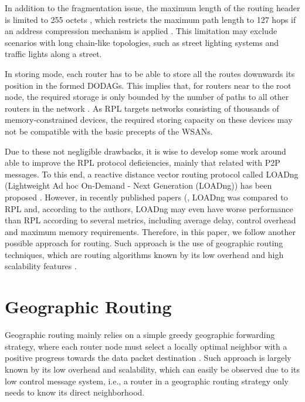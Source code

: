 \documentclass[final,authoryear,3p,twocolumn]{elsarticle}
\begin{document}
In addition to the fragmentation issue, the maximum length of the routing header is limited to 255 octets \citep{RFC4944}, which restricts the maximum path length to 127 hops if an address compression mechanism is applied \citep{herberg}. This limitation may exclude scenarios with long chain-like topologies, such as street lighting systems and traffic lights along a street.

In storing mode, each router has to be able to store all the routes downwards its position in the formed DODAGs. This implies that, for routers near to the root node, the required storage is only bounded by the number of paths to all other routers in the network \citep{RPL_observations}. As RPL targets networks consisting of thousands of memory-constrained devices, the required storing capacity on these devices may not be compatible with the basic precepts of the WSANs.

Due to these not negligible drawbacks, it is wise to develop some work around able to improve the RPL protocol deficiencies, mainly that related with P2P messages. To this end, a reactive distance vector routing protocol called LOADng (Lightweight Ad hoc On-Demand - Next Generation (LOADng)) has been proposed \citep{LOADng_2012}. However, in recently published papers (\citep{Tripathi2014, Vucinic_2013}, LOADng was compared to RPL  and, according to the authors, LOADng may even have worse performance than RPL according to several metrics, including average delay, control overhead and maximum memory requirements. Therefore, in this paper, we follow another possible approach for routing. Such approach is the use of geographic routing techniques, which are routing algorithms known by its low overhead and high scalability features \citep{Karp_GPSR_2000, Position_Based_Routing_Ad_Hoc_2001, On_Optimal_Geographic_Routing_2007}.


\section{Geographic Routing}
\label{secGeographicRouting}

Geographic routing mainly relies on a simple greedy geographic forwarding strategy, where each router node must select a locally optimal neighbor with a positive progress towards the data packet destination \citep{survey_2007}. Such approach is largely known by its low overhead and scalability, which can easily be observed due to its low control message system, i.e., a router in a geographic routing strategy only needs to know its direct neighborhood.
\end{document}
